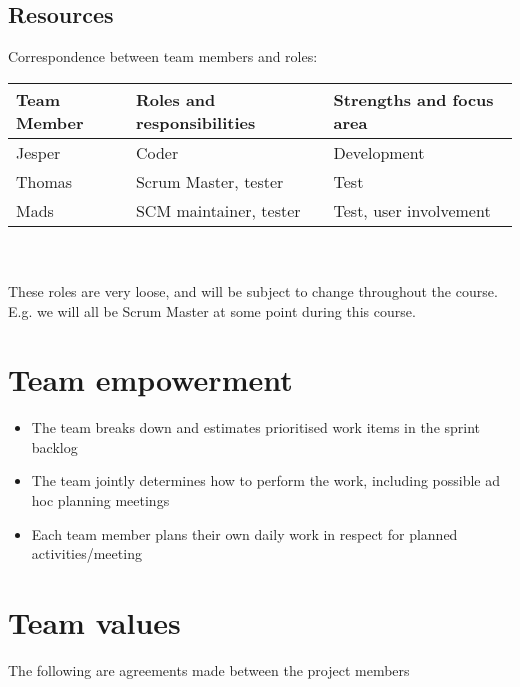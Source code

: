 \documentclass[a4paper,11pt]{article}
\begin{document}
\subsection{Resources} %
\label{subsec:resources}
Correspondence between team members and roles:\\

\begin{tabular}{|p{3cm}|p{5cm}|p{5cm}|}
\hline
\textbf{Team Member} & \textbf{Roles and responsibilities}   & \textbf{Strengths and focus area} \\\hline
Jesper               & Coder                   & Development \\\hline
Thomas               & Scrum Master, tester    & Test                 \\\hline
Mads                 & SCM maintainer, tester  & Test, user involvement                         \\\hline 
\end{tabular}
\\
\\
These roles are very loose, and will be subject to change throughout the course. E.g. we will all be Scrum Master at some point during this course.


\section{Team empowerment} %
\label{sec:team_empowerment}
\begin{itemize}
	\item The team breaks down and estimates prioritised work items in the sprint backlog

	\item The team jointly determines how to perform the work, including possible ad hoc planning meetings

	\item Each team member plans their own daily work in respect for planned activities/meeting
\end{itemize}


\section{Team values} %
\label{sec:team_values}
The following are agreements made between the project members
\end{document}
